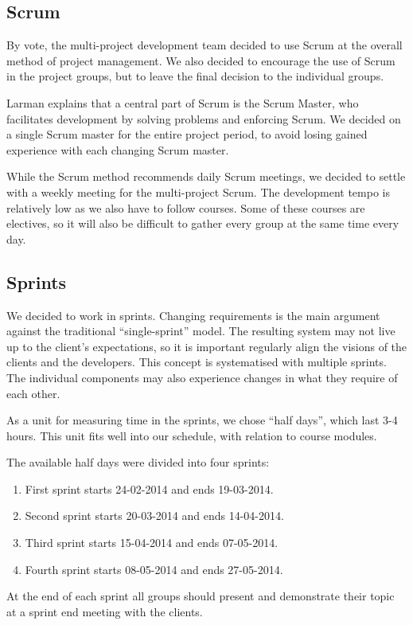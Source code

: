 \subsection{Scrum}
By vote, the multi-project development team decided to use Scrum at the overall method of project management. 
We also decided to encourage the use of Scrum in the project groups, but to leave the final decision to the individual groups. 

Larman \cite{larmanAgile} explains that a central part of Scrum is the Scrum Master, who facilitates development by solving problems and enforcing Scrum. We decided on a single Scrum master for the entire project period, to avoid losing gained experience with each changing Scrum master.

While the Scrum method recommends daily Scrum meetings, we decided to settle with a weekly meeting for the multi-project Scrum. The development tempo is relatively low as we also have to follow courses. Some of these courses are electives, so it will also be difficult to gather every group at the same time every day.

\subsection{Sprints}
We decided to work in sprints. Changing requirements is the main argument against the traditional ``single-sprint'' model. The resulting system may not live up to the client's expectations, so it is important regularly align the visions of the clients and the developers. This concept is systematised with multiple sprints. The individual components may also experience changes in what they require of each other.

As a unit for measuring time in the sprints, we chose ``half days'', which last 3-4 hours. This unit fits well into our schedule, with relation to course modules.

The available half days were divided into four sprints:

\begin{enumerate}
\item First sprint starts 24-02-2014 and ends 19-03-2014.
\item Second sprint starts 20-03-2014 and ends 14-04-2014.
\item Third sprint starts 15-04-2014 and ends 07-05-2014.
\item Fourth sprint starts 08-05-2014 and ends 27-05-2014.
\end{enumerate}

At the end of each sprint all groups should present and demonstrate their topic at a sprint end meeting with the clients.
